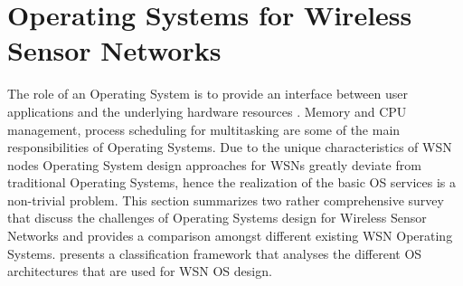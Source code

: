 \section{Operating Systems for Wireless Sensor Networks}
The role of an Operating System is to provide an interface between user applications and the underlying hardware resources \cite{Stallings:1998:OSI:272982}. Memory and CPU management, process scheduling for multitasking are some of the main responsibilities of Operating Systems.
Due to the unique characteristics of WSN nodes Operating System design approaches for WSNs greatly deviate from traditional Operating Systems, hence the realization of the basic OS services is a non-trivial problem. This section summarizes two rather comprehensive survey that discuss the challenges of Operating Systems design for Wireless Sensor Networks and provides a comparison amongst different existing WSN Operating Systems.
\cite{Reddy:2009:WSN:1593545.1593549} presents a classification framework that analyses the different OS architectures that are used for WSN OS design. 